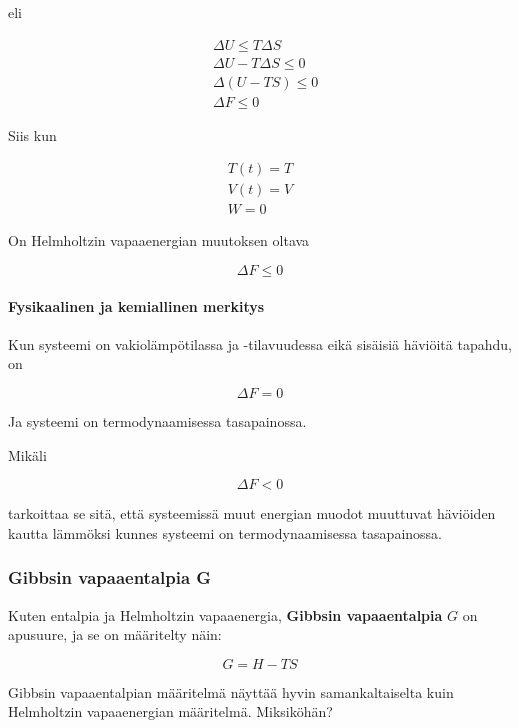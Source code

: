 \documentclass[12pt,a4paper,finnish]{book}
\begin{document}
eli 

\begin{align}
 & \Delta U \leq T\Delta S\\
 & \Delta U - T\Delta S \leq 0\\
 & \Delta(U - TS) \leq 0\\
 & \Delta F \leq 0
\end{align}

Siis kun

\begin{align}
 T(t) = T\\
 V(t) = V\\
 W = 0
\end{align}

On Helmholtzin vapaaenergian muutoksen oltava

\begin{equation}
 \Delta F \leq 0
\end{equation}

\paragraph{Fysikaalinen ja kemiallinen merkitys}

Kun systeemi on vakiolämpötilassa ja -tilavuudessa eikä sisäisiä häviöitä tapahdu, on 

\begin{equation}
 \Delta F = 0
\end{equation}

Ja systeemi on termodynaamisessa tasapainossa.

Mikäli

\begin{equation}
 \Delta F < 0
\end{equation}

tarkoittaa se sitä, että systeemissä muut energian muodot muuttuvat häviöiden kautta lämmöksi 
kunnes systeemi on termodynaamisessa tasapainossa.

\subsubsection{Gibbsin vapaaentalpia G}

Kuten entalpia ja Helmholtzin vapaaenergia, \textbf{Gibbsin vapaaentalpia} $G$ on apusuure, 
ja se on määritelty näin:

\begin{equation}
 G = H - TS
\end{equation}

Gibbsin vapaaentalpian määritelmä näyttää hyvin samankaltaiselta kuin Helmholtzin vapaaenergian määritelmä. 
Miksiköhän?
\end{document}
